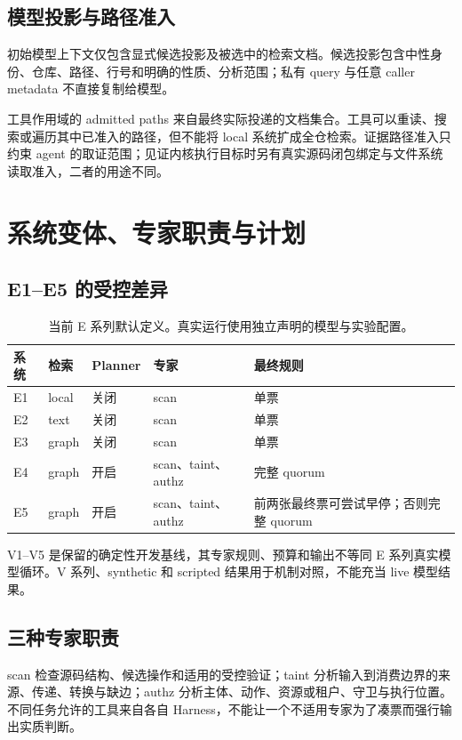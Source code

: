 \documentclass[UTF8,a4paper,zihao=-4,fontset=none]{ctexart}
\begin{document}
\subsection{模型投影与路径准入}
初始模型上下文仅包含显式候选投影及被选中的检索文档。候选投影包含中性身份、仓库、路径、行号和明确的性质、分析范围；私有 query 与任意 caller metadata 不直接复制给模型。

工具作用域的 admitted paths 来自最终实际投递的文档集合。工具可以重读、搜索或遍历其中已准入的路径，但不能将 local 系统扩成全仓检索。证据路径准入只约束 agent 的取证范围；见证内核执行目标时另有真实源码闭包绑定与文件系统读取准入，二者的用途不同。

\section{系统变体、专家职责与计划}
\subsection{E1--E5 的受控差异}
\begin{table}[htbp]
\centering\small
\begin{tabularx}{\textwidth}{L{12mm}L{23mm}L{18mm}L{42mm}Y}
\toprule 系统 & 检索 & Planner & 专家 & 最终规则\\\midrule
E1 & local & 关闭 & scan & 单票\\
E2 & text & 关闭 & scan & 单票\\
E3 & graph & 关闭 & scan & 单票\\
E4 & graph & 开启 & scan、taint、authz & 完整 quorum\\
E5 & graph & 开启 & scan、taint、authz & 前两张最终票可尝试早停；否则完整 quorum\\
\bottomrule
\end{tabularx}
\caption{当前 E 系列默认定义。真实运行使用独立声明的模型与实验配置。}
\end{table}

V1--V5 是保留的确定性开发基线，其专家规则、预算和输出不等同 E 系列真实模型循环。V 系列、synthetic 和 scripted 结果用于机制对照，不能充当 live 模型结果。

\subsection{三种专家职责}
scan 检查源码结构、候选操作和适用的受控验证；taint 分析输入到消费边界的来源、传递、转换与缺边；authz 分析主体、动作、资源或租户、守卫与执行位置。不同任务允许的工具来自各自 Harness，不能让一个不适用专家为了凑票而强行输出实质判断。
\end{document}

